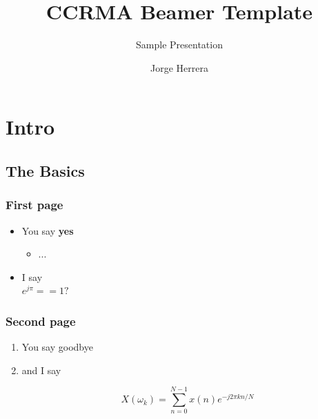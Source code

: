 \documentclass{beamer}
\title{CCRMA Beamer Template}
\subtitle{Sample Presentation}
\author{Jorge Herrera}
\date
\begin{document}
\begin{frame}[plain]
    \titlepage
\end{frame}
\addtocounter{framenumber}{-1}  %


\begin{frame}[plain]
    \tableofcontents
\end{frame}
\addtocounter{framenumber}{-1}  %

\section[Intro]{Intro}
\begin{frame}[plain]
    \tableofcontents[currentsection]
\end{frame}
\addtocounter{framenumber}{-1}  %

\subsection[basics]{The Basics}

\begin{frame}\frametitle{First page}
    \begin{itemize}
    \item You say \textbf{yes}
        \begin{itemize}
        \item ...
        \end{itemize}
    \item I say \\
    \centering
    $e^{j \pi} == 1?$
    \end{itemize}

\end{frame}

\begin{frame}\frametitle{Second page}
    \begin{enumerate}
    \item You say goodbye
    \item and I say

    \begin{equation}
    X(\omega_k) = \sum_{n=0}^{N-1}x(n)e^{-j2\pi kn/N}
    \end{equation}

    \end{enumerate}
\end{frame}
\end{document}
